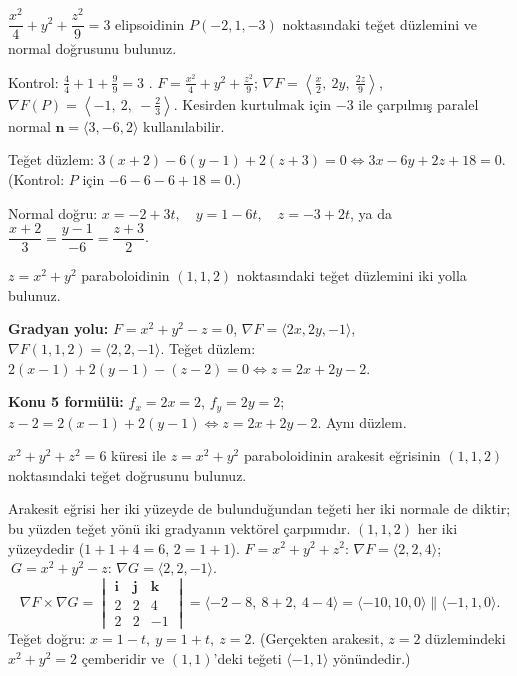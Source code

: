 \begin{soru}
$\dfrac{x^2}{4}+y^2+\dfrac{z^2}{9}=3$ elipsoidinin $P(-2,1,-3)$ noktasındaki teğet düzlemini ve normal doğrusunu bulunuz.
\end{soru}
\begin{cevap}
Kontrol: $\frac44+1+\frac99=3$ \checkmark. $F=\frac{x^2}{4}+y^2+\frac{z^2}{9}$; $\nabla F=\left\langle\frac x2,\ 2y,\ \frac{2z}{9}\right\rangle$,
$\nabla F(P)=\left\langle-1,\ 2,\ -\frac23\right\rangle$. Kesirden kurtulmak için $-3$ ile çarpılmış paralel normal
$\mathbf n=\langle3,-6,2\rangle$ kullanılabilir.

Teğet düzlem: $3(x+2)-6(y-1)+2(z+3)=0\iff\boxed{3x-6y+2z+18=0}$. (Kontrol: $P$ için $-6-6-6+18=0$.)

Normal doğru: $x=-2+3t,\quad y=1-6t,\quad z=-3+2t$, ya da $\dfrac{x+2}{3}=\dfrac{y-1}{-6}=\dfrac{z+3}{2}$.
\end{cevap}

\begin{soru}
$z=x^2+y^2$ paraboloidinin $(1,1,2)$ noktasındaki teğet düzlemini iki yolla bulunuz.
\end{soru}
\begin{cevap}
\textbf{Gradyan yolu:} $F=x^2+y^2-z=0$, $\nabla F=\langle2x,2y,-1\rangle$, $\nabla F(1,1,2)=\langle2,2,-1\rangle$.
Teğet düzlem: $2(x-1)+2(y-1)-(z-2)=0\iff z=2x+2y-2$.

\textbf{Konu 5 formülü:} $f_x=2x=2$, $f_y=2y=2$; $z-2=2(x-1)+2(y-1)\iff z=2x+2y-2$. Aynı düzlem. \checkmark
\end{cevap}

\begin{soru}
$x^2+y^2+z^2=6$ küresi ile $z=x^2+y^2$ paraboloidinin arakesit eğrisinin $(1,1,2)$ noktasındaki teğet doğrusunu bulunuz.
\end{soru}
\begin{cevap}
Arakesit eğrisi her iki yüzeyde de bulunduğundan teğeti her iki normale de diktir; bu yüzden teğet yönü iki gradyanın
vektörel çarpımıdır. $(1,1,2)$ her iki yüzeydedir ($1+1+4=6$, $2=1+1$).
$F=x^2+y^2+z^2$: $\nabla F=\langle2,2,4\rangle$; $\ G=x^2+y^2-z$: $\nabla G=\langle2,2,-1\rangle$.
\[
\nabla F\times\nabla G=\begin{vmatrix}\mathbf i&\mathbf j&\mathbf k\\ 2&2&4\\ 2&2&-1\end{vmatrix}
=\langle-2-8,\ 8+2,\ 4-4\rangle=\langle-10,10,0\rangle\parallel\langle-1,1,0\rangle .
\]
Teğet doğru: $x=1-t,\ y=1+t,\ z=2$. (Gerçekten arakesit, $z=2$ düzlemindeki $x^2+y^2=2$ çemberidir ve $(1,1)$'deki
teğeti $\langle-1,1\rangle$ yönündedir.)
\end{cevap}

